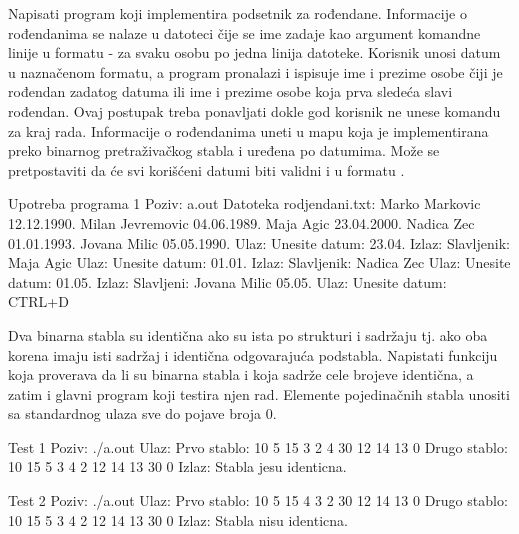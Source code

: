 \begin{Exercise}[label=706, difficulty=1]
Napisati program koji implementira podsetnik za rođendane. Informacije o rođendanima se nalaze u datoteci čije se ime zadaje kao argument komandne linije u formatu  - za svaku osobu po jedna linija datoteke. Korisnik unosi datum u naznačenom formatu, a program pronalazi i ispisuje ime i prezime osobe čiji je rođendan zadatog datuma ili ime i prezime osobe koja prva sledeća slavi rođendan. Ovaj postupak treba ponavljati dokle god korisnik ne unese komandu za kraj rada. Informacije o rođendanima uneti u mapu koja je implementirana preko binarnog pretraživačkog stabla i uređena po datumima. Može se pretpostaviti da će svi korišćeni datumi biti validni i u formatu .
\begin{maxitest}
\begin{test}{Upotreba programa 1}
Poziv: a.out
Datoteka rodjendani.txt:
	Marko Markovic 12.12.1990.
	Milan Jevremovic 04.06.1989.
	Maja Agic 23.04.2000.
	Nadica Zec 01.01.1993.
	Jovana Milic 05.05.1990.
Ulaz:
	Unesite datum: 23.04.
Izlaz:
	Slavljenik: Maja Agic 
Ulaz:	
	Unesite datum: 01.01.
Izlaz:
	Slavljenik: Nadica Zec
Ulaz:
	Unesite datum: 01.05.
Izlaz:	
	Slavljeni: Jovana Milic 05.05.
Ulaz:	
	Unesite datum: CTRL+D
\end{test}
\end{maxitest}
\end{Exercise}

\begin{Answer}[ref=706]
\end{Answer}



\begin{Exercise}[label=707]
Dva binarna stabla su identična ako su ista po strukturi i sadržaju tj. ako oba korena imaju isti sadržaj i identična odgovarajuća podstabla. Napistati funkciju  koja proverava da li su binarna stabla  i  koja sadrže cele brojeve identična, a zatim i glavni program koji testira njen rad. Elemente pojedinačnih stabla unositi sa standardnog ulaza sve do pojave broja $0$.

\begin{maxitest}
\begin{test}{Test 1}
Poziv: ./a.out
Ulaz:
	Prvo stablo: 10 5 15 3 2 4 30 12 14 13 0
	Drugo stablo: 10 15 5 3 4 2 12 14 13 30 0
Izlaz:
	Stabla jesu identicna.
\end{test}
\end{maxitest}

\begin{maxitest}
\begin{test}{Test 2}
Poziv: ./a.out
Ulaz:
	Prvo stablo: 10 5 15 4 3 2 30 12 14 13 0
	Drugo stablo: 10 15 5 3 4 2 12 14 13 30 0
Izlaz:
	Stabla nisu identicna.
\end{test}
\end{maxitest}

\end{Exercise}

